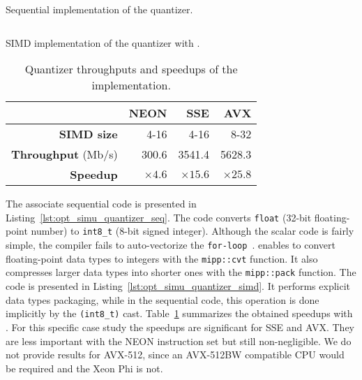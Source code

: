 \begin{listing}[htp]
  \inputminted[frame=lines,linenos]{C++}{\curChapter/src/simu/quantizer/quantizer_seq.cpp}
  \caption{Sequential implementation of the quantizer.}
  \label{lst:opt_simu_quantizer_seq}
\end{listing}

\begin{listing}[htp]
  \inputminted[frame=lines,linenos]{C++}{\curChapter/src/simu/quantizer/quantizer_simd.cpp}
  \caption{SIMD implementation of the quantizer with \MIPP.}
  \label{lst:opt_simu_quantizer_simd}
\end{listing}

\begin{table}[htp]
  \centering
  \caption{Quantizer throughputs and speedups of the \MIPP implementation.}
  \label{tab:opt_simu_quantizer_speedup}
  \begin{tabular}{r | r  r r}
                             & \textbf{NEON} & \textbf{SSE}  & \textbf{AVX}  \\ \hline \hline
  \textbf{SIMD size}         & 4-16          & 4-16          & 8-32          \\ %
  \textbf{Throughput} (Mb/s) & 300.6         & 3541.4        & 5628.3        \\ %
  \textbf{Speedup}           & $\times 4.6$  & $\times 15.6$ & $\times 25.8$ \\
  \end{tabular}
\end{table}

The associate sequential code is presented in
Listing~\ref{lst:opt_simu_quantizer_seq}. The code converts \verb|float| (32-bit
floating-point number) to \verb|int8_t| (8-bit signed integer). Although the
scalar code is fairly simple, the compiler fails to auto-vectorize the
\verb|for-loop|~\cite{Cassagne2018}. \MIPP enables to convert floating-point
data types to integers with the \verb|mipp::cvt| function. It also compresses
larger data types into shorter ones with the \verb|mipp::pack| function. The
\MIPP code is presented in Listing~\ref{lst:opt_simu_quantizer_simd}. It
performs explicit data types packaging, while in the sequential code, this
operation is done implicitly by the \verb|(int8_t)| cast.
Table~\ref{tab:opt_simu_quantizer_speedup} summarizes the obtained speedups with
\MIPP. For this specific case study the speedups are significant for SSE and
AVX. They are less important with the NEON instruction set but still
non-negligible. We do not provide results for AVX-512, since an AVX-512BW
compatible CPU would be required and the Xeon Phi is not.

